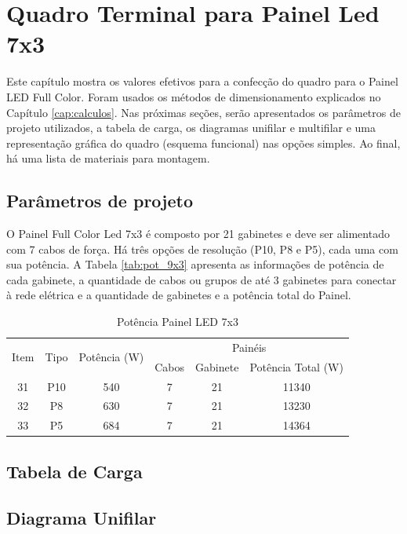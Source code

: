 \chapter{Quadro Terminal para Painel Led 7x3}

Este capítulo mostra os valores efetivos para a confecção do quadro para o Painel LED Full Color. Foram usados os métodos de dimensionamento explicados no Capítulo \ref{cap:calculos}. Nas próximas seções, serão apresentados os parâmetros de projeto utilizados, a tabela de carga, os diagramas unifilar e multifilar e uma representação gráfica do quadro (esquema funcional) nas opções simples. Ao final, há uma lista de materiais para montagem.

\section{Parâmetros de projeto}

O Painel Full Color Led 7x3 é composto por 21 gabinetes e deve ser alimentado com 7 cabos de força. Há três opções de resolução (P10, P8 e P5), cada uma com sua potência. A Tabela \ref{tab:pot_9x3} apresenta as informações de potência de cada gabinete, a quantidade de cabos ou grupos de até 3 gabinetes para conectar à rede elétrica e a quantidade de gabinetes e a potência total do Painel.



\begin{table}[htbp]
\caption{Potência Painel LED 7x3}
\centering
\begin{tabular}{cccccc}
\toprule
\multirow{2}{*}{Item} & \multirow{2}{*}{Tipo} & \multirow{2}{*}{Potência (W)} & \multicolumn{3}{c}{Painéis} \\
\cmidrule{4-6}
& & & Cabos  & Gabinete & Potência Total (W) \\
\midrule


31 & P10 & 540 & 7 & 21 & 11340 \\
32 & P8 & 630 & 7 & 21 & 13230 \\
33 & P5 & 684 & 7 & 21 & 14364 \\


\bottomrule
\end{tabular}
\label{tab:pot_7x3}
\end{table}



\section{Tabela de Carga}
\section{Diagrama Unifilar}


